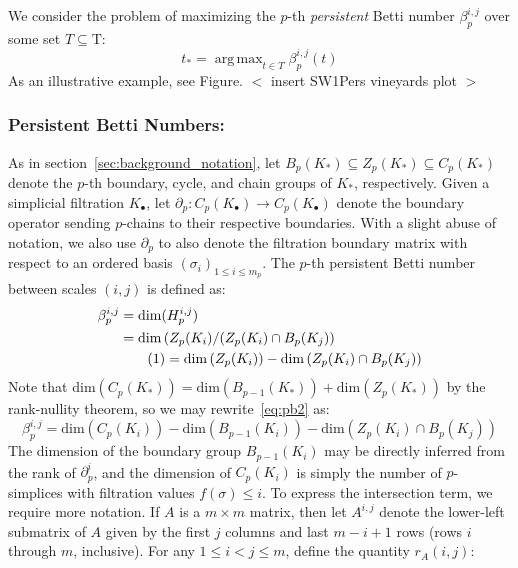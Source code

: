 \documentclass[10pt]{article}
\DeclareMathOperator*{\argmax}{arg\,max}
\newcommand\numberthis{\addtocounter{equation}{1}\tag{\theequation}}
\begin{document}
We consider the problem of maximizing the $p$-th \emph{persistent} Betti number $\beta^{i,j}_p$ over some set $T \subseteq \mathrm{T}$: 
\begin{equation}
	t_\ast = \argmax_{t \in T}	 \beta_{p}^{i,j}(t)
\end{equation}
As an illustrative example, see Figure. 
$<$ insert SW1Pers vineyards plot $>$


\subsubsection*{Persistent Betti Numbers:} 
As in section~\ref{sec:background_notation}, let $B_p(K_\ast) \subseteq Z_p(K_\ast) \subseteq C_p(K_\ast)$ denote the $p$-th boundary, cycle, and chain groups of $K_\ast$, respectively. 
Given a simplicial filtration $K_{\bullet}$, let $\partial_p : C_p( K_{\bullet}) \to C_p(K_{\bullet})$ denote the boundary operator sending $p$-chains to their respective boundaries. 
With a slight abuse of notation, we also use $\partial_p$ to also denote the filtration boundary matrix with respect to an ordered basis $(\sigma_i)_{1 \leq i \leq m_p}$.  
The $p$-th persistent Betti number between scales $(i,j)$ is defined as: 
\begin{align*}
	\beta_p^{i,j} &= \mathrm{dim}(H_p^{i,j}) \\
	&= \mathrm{dim} \left( Z_p(K_i) / (Z_p(K_i) \cap B_p(K_j) \right) \\
	& \numberthis = \mathrm{dim} \left( Z_p(K_i) \right) - \mathrm{dim}\left( Z_p(K_i) \cap B_p(K_j) \right ) \label{eq:pb2}
\end{align*}
Note that $\mathrm{dim}(C_p(K_\ast)) = \mathrm{dim}(B_{p-1}(K_\ast)) + \mathrm{dim}(Z_p(K_\ast))$ by the rank-nullity theorem, so we may rewrite~\eqref{eq:pb2} as:
\begin{equation} \label{eq:pb3}
\beta_p^{i,j} = \mathrm{dim} \left( C_p(K_i) \right) - \mathrm{dim} \left( B_{p-1}(K_i) \right) - \mathrm{dim}\left( Z_p(K_i) \cap B_p(K_j) \right )  
\end{equation}
The dimension of the boundary group $B_{p-1}(K_i)$ may be directly inferred from the rank of $\partial_p^{i}$, and the dimension of $C_p(K_i)$ is simply the number of $p$-simplices with filtration values $f(\sigma) \leq i$. To express the intersection term, we require more notation. If $A$ is a $m \times m$ matrix, then let $A^{i,j}$ denote the lower-left submatrix of $A$ given by the first $j$ columns and last $m - i + 1$ rows (rows $i$ through $m$, inclusive). For any $1 \leq i < j \leq m$, define the quantity $r_A(i,j)$:
\end{document}
